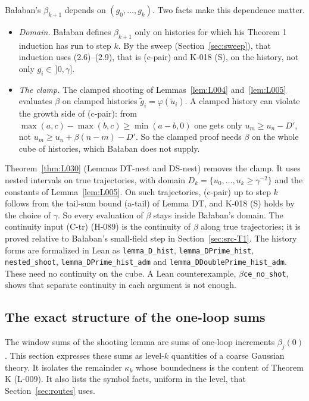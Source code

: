Ba{\l}aban's $\beta_{k+1}$ depends on $(g_0,\dots,g_k)$. Two facts make this dependence matter.
\begin{itemize}
  \item \emph{Domain.} Ba{\l}aban defines $\beta_{k+1}$ only on histories for which his Theorem 1 induction has run to step $k$. By the sweep (Section~\ref{sec:sweep}), that induction uses (2.6)--(2.9), that is (c-pair) and K-018 (S), on the history, not only $g_i\in\,]0,\gamma]$.
  \item \emph{The clamp.} The clamped shooting of Lemmas~\ref{lem:L004} and~\ref{lem:L005} evaluates $\beta$ on clamped histories $\tilde g_i=\varphi(\tilde u_i)$. A clamped history can violate the growth side of (c-pair): from $\max(a,c)-\max(b,c)\ge\min(a-b,0)$ one gets only $u_m\ge u_n-D'$, not $u_m\ge u_n+\beta(n-m)-D'$. So the clamped proof needs $\beta$ on the whole cube of histories, which Ba{\l}aban does not supply.
\end{itemize}
Theorem~\ref{thm:L030} (Lemmas DT-nest and DS-nest) removes the clamp. It uses nested intervals on true trajectories, with domain $D_k=\{u_0,\dots,u_k\ge\gamma^{-2}\}$ and the constants of Lemma~\ref{lem:L005}. On such trajectories, (c-pair) up to step $k$ follows from the tail-sum bound (a-tail) of Lemma DT, and K-018 (S) holds by the choice of $\gamma$. So every evaluation of $\beta$ stays inside Ba{\l}aban's domain. The continuity input (C-tr) (H-089) is the continuity of $\beta$ along true trajectories; it is proved relative to Ba{\l}aban's small-field step in Section~\ref{sec:src-T1}. The history forms are formalized in Lean as \texttt{lemma\_D\_hist}, \texttt{lemma\_DPrime\_hist}, \texttt{nested\_shoot}, \texttt{lemma\_DPrime\_hist\_adm} and \texttt{lemma\_DDoublePrime\_hist\_adm}. These need no continuity on the cube. A Lean counterexample, \texttt{$\beta$ce\_no\_shot}, shows that separate continuity in each argument is not enough.

\subsection{The exact structure of the one-loop sums}\label{sec:oneloop}

The window sums of the shooting lemma are sums of one-loop increments $\beta_j(0)$. This section expresses these sums as level-$k$ quantities of a coarse Gaussian theory. It isolates the remainder $\kappa_k$ whose boundedness is the content of Theorem K (L-009). It also lists the symbol facts, uniform in the level, that Section~\ref{sec:routes} uses.

